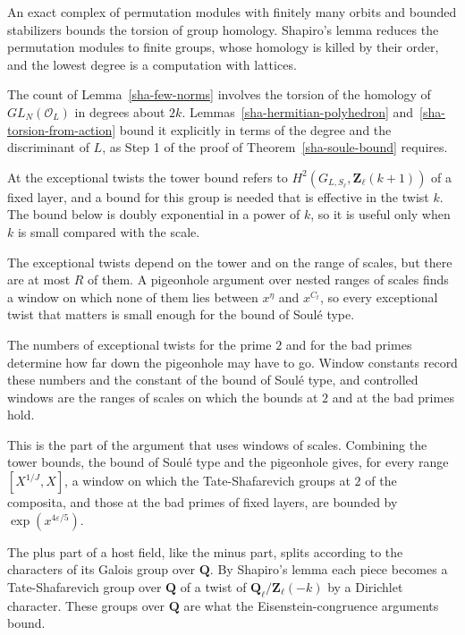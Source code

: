 An exact complex of permutation modules with finitely many orbits and bounded stabilizers bounds the torsion of group homology. Shapiro's lemma reduces the permutation modules to finite groups, whose homology is killed by their order, and the lowest degree is a computation with lattices.

The count of Lemma~\ref{sha-few-norms} involves the torsion of the homology of $GL_N(\mathcal O_L)$ in degrees about $2k$. Lemmas~\ref{sha-hermitian-polyhedron} and~\ref{sha-torsion-from-action} bound it explicitly in terms of the degree and the discriminant of $L$, as Step 1 of the proof of Theorem~\ref{sha-soule-bound} requires.

At the exceptional twists the tower bound refers to $H^2(G_{L,S_\ell},\mathbf Z_\ell(k+1))$ of a fixed layer, and a bound for this group is needed that is effective in the twist $k$. The bound below is doubly exponential in a power of $k$, so it is useful only when $k$ is small compared with the scale.

The exceptional twists depend on the tower and on the range of scales, but there are at most $R$ of them. A pigeonhole argument over nested ranges of scales finds a window on which none of them lies between $x^{\eta}$ and $x^{C_t}$, so every exceptional twist that matters is small enough for the bound of Soulé type.

The numbers of exceptional twists for the prime $2$ and for the bad primes determine how far down the pigeonhole may have to go. Window constants record these numbers and the constant of the bound of Soulé type, and controlled windows are the ranges of scales on which the bounds at $2$ and at the bad primes hold.

This is the part of the argument that uses windows of scales. Combining the tower bounds, the bound of Soulé type and the pigeonhole gives, for every range $[X^{1/J},X]$, a window on which the Tate-Shafarevich groups at $2$ of the composita, and those at the bad primes of fixed layers, are bounded by $\exp(x^{4\varepsilon/5})$.

The plus part of a host field, like the minus part, splits according to the characters of its Galois group over $\mathbf Q$. By Shapiro's lemma each piece becomes a Tate-Shafarevich group over $\mathbf Q$ of a twist of $\mathbf Q_\ell/\mathbf Z_\ell(-k)$ by a Dirichlet character. These groups over $\mathbf Q$ are what the Eisenstein-congruence arguments bound.

